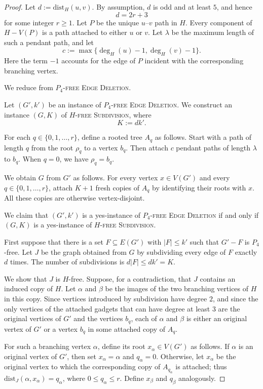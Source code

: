 \documentclass[a4paper,UKenglish,cleveref, autoref, thm-restate]{lipics-v2021}
\newcommand{\dist}{\mathrm{dist}}
\begin{document}
\begin{proof}

Let $d:=\dist_H(u,v)$. By assumption, $d$ is odd and at least $5$, and hence
\[
    d=2r+3
\]
for some integer $r\geq 1$.  Let $P$ be the unique $u$--$v$ path in $H$.
Every component of $H-V(P)$ is a path attached to either $u$ or $v$.  Let
$\lambda$ be the maximum length of such a pendant path, and let
\[
    c:=\max\{\deg_H(u)-1,\deg_H(v)-1\}.
\]
Here the term $-1$ accounts for the edge of $P$ incident with the corresponding
branching vertex.

We reduce from \textsc{$P_4$-free Edge Deletion}. %

Let $(G',k')$ be an instance of \textsc{$P_4$-free Edge Deletion}.  We construct
an instance $(G,K)$ of \textsc{$H$-free Subdivision}, where
\[
    K:=d k'.
\]

For each $q\in\{0,1,\ldots,r\}$, define a rooted tree $A_q$ as follows.
Start with a path of length $q$ from the root $\rho_q$ to a vertex $b_q$.
Then attach $c$ pendant paths of length $\lambda$ to $b_q$.
When $q=0$, we have $\rho_q=b_q$.

We obtain $G$ from $G'$ as follows.  For every vertex $x\in V(G')$ and every
$q\in\{0,1,\ldots,r\}$, attach $K+1$ fresh copies of $A_q$ by identifying
their roots with $x$.  All these copies are otherwise vertex-disjoint.

We claim that $(G',k')$ is a yes-instance of
\textsc{$P_4$-free Edge Deletion} if and only if $(G,K)$ is a yes-instance of
\textsc{$H$-free Subdivision}.

First suppose that there is a set $F\subseteq E(G')$ with $|F|\leq k'$ such
that $G'-F$ is $P_4$-free.  Let $J$ be the graph obtained from $G$ by subdividing
every edge of $F$ exactly $d$ times.  The number of subdivisions is
$d|F|\leq dk'=K$.

We show that $J$ is $H$-free.  Suppose, for a contradiction, that $J$ contains
an induced copy of $H$.  Let $\alpha$ and $\beta$ be the images of the two
branching vertices of $H$ in this copy.  Since vertices introduced by
subdivision have degree $2$, and since the only vertices of the attached
gadgets that can have degree at least $3$ are the original vertices of $G'$
and the vertices $b_q$, each of $\alpha$ and $\beta$ is either an original
vertex of $G'$ or a vertex $b_q$ in some attached copy of $A_q$.

For such a branching vertex $\alpha$, define its root $x_\alpha\in V(G')$ as
follows.  If $\alpha$ is an original vertex of $G'$, then set
$x_\alpha=\alpha$ and $q_\alpha=0$.  Otherwise, let $x_\alpha$ be the original
vertex to which the corresponding copy of $A_{q_\alpha}$ is attached; thus
$\dist_J(\alpha,x_\alpha)=q_\alpha$, where $0\leq q_\alpha\leq r$.
Define $x_\beta$ and $q_\beta$ analogously.


\end{proof}
\end{document}
